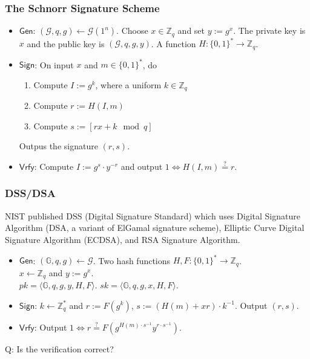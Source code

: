 \begin{frame}\frametitle{The Schnorr Signature Scheme}
\begin{construction}
\begin{itemize}
\item $\mathsf{Gen}$: $(\mathcal{G}, q, g) \gets \mathcal{G}(1^n)$. Choose $x \in \mathbb{Z}_q$ and set $y := g^x$. The private key is $x$ and the public key is $(\mathcal{G}, q, g, y)$. A function $H : \{0,1\}^* \to \mathbb{Z}_q$.
\item $\mathsf{Sign}$: On input $x$ and $m \in \{0,1\}^*$, do
\begin{enumerate}
\item Compute $I := g^k$, where a uniform $k \in \mathbb{Z}_q$
\item Compute $r := H(I, m)$
\item Compute $s := [ rx + k \mod q]$
\end{enumerate}
Outpus the signature $(r, s)$.
\item $\mathsf{Vrfy}$: Compute $I := g^s \cdot y^{-r}$ and output $1 \iff H(I, m) \overset{?}{=} r.$
\end{itemize}
\end{construction}
\end{frame}

\begin{frame}\frametitle{DSS/DSA}
NIST published DSS (Digital Signature Standard) which uses Digital Signature Algorithm (DSA, a variant of ElGamal signature scheme), Elliptic Curve Digital Signature Algorithm (ECDSA), and RSA Signature Algorithm.
\begin{construction}
\begin{itemize}
\item $\mathsf{Gen}$: $(\mathbb{G},q,g) \gets \mathcal{G}$. Two hash functions $H, F : \{0,1\}^* \to \mathbb{Z}_q$. \\
$x \gets \mathbb{Z}_q$ and $y:= g^x $.\\
$pk = \langle \mathbb{G},q,g,y,H,F\rangle$. $sk=\langle \mathbb{G},q,g,x,H,F\rangle$.
\item $\mathsf{Sign}$: $k\gets \mathbb{Z}^*_q$ and $r:= F(g^k) $, $s:= (H(m)+xr)\cdot k^{-1}$. Output $(r,s)$.
\item $\mathsf{Vrfy}$: Output $1 \iff r \overset{?}{=} F(g^{H(m)\cdot s^{-1}}y^{r\cdot s^{-1}}).$
\end{itemize}
\end{construction}
\alert{Q: Is the verification correct?}
\end{frame}

